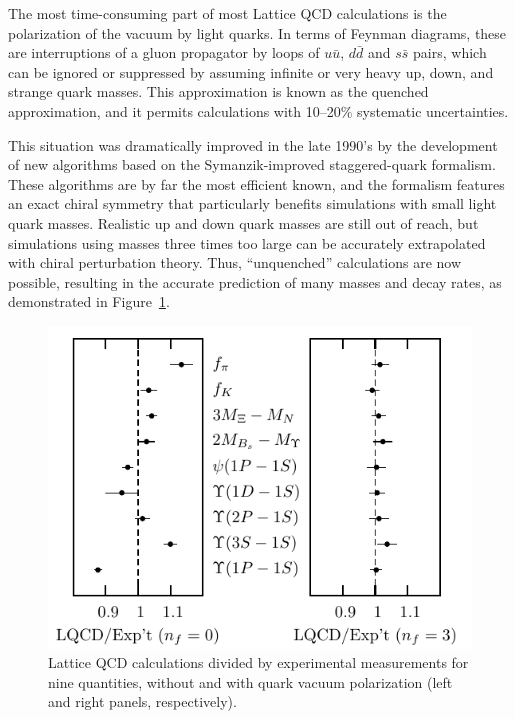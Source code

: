 \documentclass{cornell}
\begin{document}
The most time-consuming part of most Lattice QCD calculations is the
polarization of the vacuum by light quarks.  In terms of Feynman
diagrams, these are interruptions of a gluon propagator by loops of
$u\bar{u}$, $d\bar{d}$ and $s\bar{s}$ pairs, which can be ignored or
suppressed by assuming infinite or very heavy up, down, and strange
quark masses.  This approximation is known as the quenched
approximation, and it permits calculations with 10--20\% systematic
uncertainties.

This situation was dramatically improved in the late 1990's by the
development of new algorithms based on the Symanzik-improved
staggered-quark formalism.  These algorithms are by far the most
efficient known, and the formalism features an exact chiral symmetry
that particularly benefits simulations with small light quark masses.
Realistic up and down quark masses are still out of reach, but
simulations using masses three times too large can be accurately
extrapolated with chiral perturbation theory.  Thus, ``unquenched''
calculations are now possible, resulting in the accurate prediction of
many masses and decay rates, as demonstrated in Figure~\ref{latticevictory}.

\begin{figure}[p]
  \begin{center}
    \includegraphics[width=\linewidth]{plots/latticevictory}
  \end{center}
  \caption{\label{latticevictory} Lattice QCD calculations divided by
  experimental measurements for nine quantities, without and with
  quark vacuum polarization (left and right panels, respectively).}
\end{figure}
\end{document}
